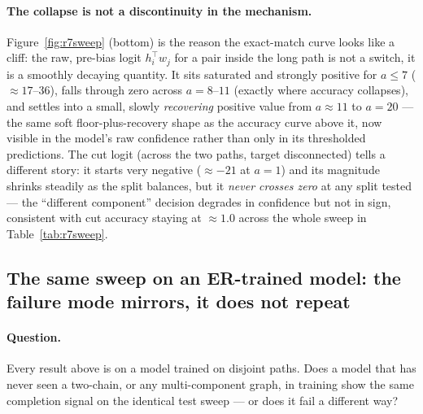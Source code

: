 \documentclass[11pt,a4paper]{article}
\begin{document}
\paragraph{The collapse is not a discontinuity in the mechanism.} Figure~\ref{fig:r7sweep}
(bottom) is the reason the exact-match curve looks like a cliff: the raw,
pre-bias logit $h_i^\top w_j$ for a pair inside the long path is not a switch,
it is a smoothly decaying quantity. It sits saturated and strongly positive for
$a\le7$ ($\approx17$--$36$), falls through zero across $a=8$--$11$ (exactly
where accuracy collapses), and settles into a small, slowly \emph{recovering}
positive value from $a\approx11$ to $a=20$ --- the same soft floor-plus-recovery
shape as the accuracy curve above it, now visible in the model's raw confidence
rather than only in its thresholded predictions. The cut logit (across the two
paths, target disconnected) tells a different story: it starts very negative
($\approx-21$ at $a=1$) and its magnitude shrinks steadily as the split
balances, but it \emph{never crosses zero} at any split tested --- the
``different component'' decision degrades in confidence but not in sign,
consistent with cut accuracy staying at $\approx1.0$ across the whole sweep in
Table~\ref{tab:r7sweep}.

\subsection{The same sweep on an ER-trained model: the failure mode mirrors, it does not repeat}
\label{sec:res-sweep-er}

\paragraph{Question.} Every result above is on a model trained on disjoint paths. Does a
model that has never seen a two-chain, or any multi-component graph, in training show the
same completion signal on the identical test sweep --- or does it fail a different way?
\end{document}
